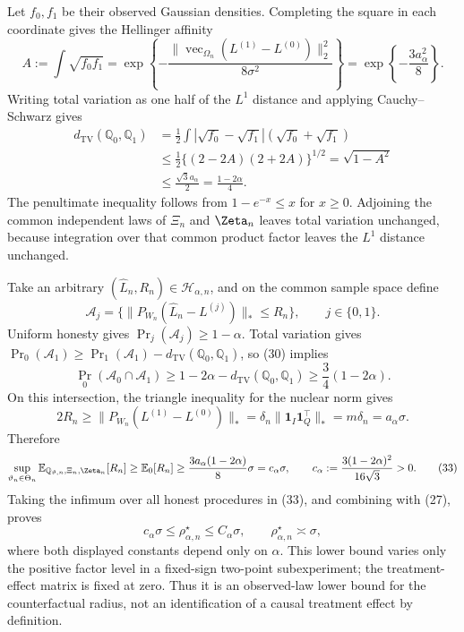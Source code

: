 Let \(f_0,f_1\) be their observed Gaussian densities.  Completing the square in each coordinate gives the Hellinger affinity
\[
A:=\int\sqrt{f_0f_1}
=\exp\!\left\{-\frac{\lVert
\operatorname{vec}_{\Omega_n}(L^{(1)}-L^{(0)})\rVert_2^2}
{8\sigma^2}\right\}
=\exp\!\left\{-\frac{3a_\alpha^2}{8}\right\}.       \tag{29}
\]
Writing total variation as one half of the \(L^1\) distance and applying Cauchy--Schwarz gives
\[
\begin{aligned}
d_{\mathrm{TV}}(\mathbb Q_0,\mathbb Q_1)
&=\frac12\int|\sqrt{f_0}-\sqrt{f_1}|(\sqrt{f_0}+\sqrt{f_1})\\
&\le\frac12\{(2-2A)(2+2A)\}^{1/2}
=\sqrt{1-A^2}\\
&\le\frac{\sqrt3a_\alpha}{2}
=\frac{1-2\alpha}{4}.                                  \tag{30}
\end{aligned}
\]
The penultimate inequality follows from \(1-e^{-x}\le x\) for \(x\ge0\).  Adjoining the common independent laws of \(\Xi_n\) and \(\Zeta_n\) leaves total variation unchanged, because integration over that common product factor leaves the \(L^1\) distance unchanged.

Take an arbitrary \((\widehat L_n,R_n)\in\mathcal H_{\alpha,n}\), and on the common sample space define
\[
\mathcal A_j=
\{\lVert P_{W_n}(\widehat L_n-L^{(j)})\rVert_*\le R_n\},
\qquad j\in\{0,1\}.
\]
Uniform honesty gives \(\Pr_j(\mathcal A_j)\ge1-\alpha\).  Total variation gives \(\Pr_0(\mathcal A_1)\ge\Pr_1(\mathcal A_1)-d_{\mathrm{TV}}(\mathbb Q_0,\mathbb Q_1)\), so (30) implies
\[
\Pr_0(\mathcal A_0\cap\mathcal A_1)
\ge1-2\alpha-d_{\mathrm{TV}}(\mathbb Q_0,\mathbb Q_1)
\ge\frac34(1-2\alpha).                                 \tag{31}
\]
On this intersection, the triangle inequality for the nuclear norm gives
\[
2R_n\ge\lVert P_{W_n}(L^{(1)}-L^{(0)})\rVert_*
=\delta_n\lVert\mathbf1_I\mathbf1_Q^{\top}\rVert_*
=m\delta_n=a_\alpha\sigma.                             \tag{32}
\]
Therefore
\[
\sup_{\vartheta_n\in\Theta_n}
\mathbb E_{\mathbb Q_{\vartheta,n},\Xi_n,\Zeta_n}[R_n]
\ge\mathbb E_0[R_n]
\ge\frac{3a_\alpha(1-2\alpha)}8\sigma
=c_\alpha\sigma,
\qquad
c_\alpha:=\frac{3(1-2\alpha)^2}{16\sqrt3}>0.          \tag{33}
\]
Taking the infimum over all honest procedures in (33), and combining with (27), proves
\[
c_\alpha\sigma\le\rho_{\alpha,n}^{\star}\le C_\alpha\sigma,
\qquad \rho_{\alpha,n}^{\star}\asymp\sigma,          \tag{34}
\]
where both displayed constants depend only on \(\alpha\).  This lower bound varies only the positive factor level in a fixed-sign two-point subexperiment; the treatment-effect matrix is fixed at zero.  Thus it is an observed-law lower bound for the counterfactual radius, not an identification of a causal treatment effect by definition.

